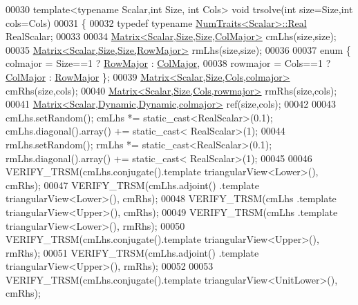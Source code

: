 \begin{DoxyCode}
00030 \textcolor{keyword}{template}<\textcolor{keyword}{typename} Scalar,\textcolor{keywordtype}{int} Size, \textcolor{keywordtype}{int} Cols> \textcolor{keywordtype}{void} trsolve(\textcolor{keywordtype}{int} size=Size,\textcolor{keywordtype}{int} cols=Cols)
00031 \{
00032   \textcolor{keyword}{typedef} \textcolor{keyword}{typename} \hyperlink{group___core___module_struct_eigen_1_1_num_traits}{NumTraits<Scalar>::Real} RealScalar;
00033 
00034   \hyperlink{group___core___module_class_eigen_1_1_matrix}{Matrix<Scalar,Size,Size,ColMajor>} cmLhs(size,size);
00035   \hyperlink{group___core___module_class_eigen_1_1_matrix}{Matrix<Scalar,Size,Size,RowMajor>} rmLhs(size,size);
00036 
00037   \textcolor{keyword}{enum} \{  colmajor = Size==1 ? \hyperlink{group__enums_ggaacded1a18ae58b0f554751f6cdf9eb13acfcde9cd8677c5f7caf6bd603666aae3}{RowMajor} : \hyperlink{group__enums_ggaacded1a18ae58b0f554751f6cdf9eb13a0cbd4bdd0abcfc0224c5fcb5e4f6669a}{ColMajor},
00038           rowmajor = Cols==1 ? \hyperlink{group__enums_ggaacded1a18ae58b0f554751f6cdf9eb13a0cbd4bdd0abcfc0224c5fcb5e4f6669a}{ColMajor} : \hyperlink{group__enums_ggaacded1a18ae58b0f554751f6cdf9eb13acfcde9cd8677c5f7caf6bd603666aae3}{RowMajor} \};
00039   \hyperlink{group___core___module_class_eigen_1_1_matrix}{Matrix<Scalar,Size,Cols,colmajor>} cmRhs(size,cols);
00040   \hyperlink{group___core___module_class_eigen_1_1_matrix}{Matrix<Scalar,Size,Cols,rowmajor>} rmRhs(size,cols);
00041   \hyperlink{group___core___module_class_eigen_1_1_matrix}{Matrix<Scalar,Dynamic,Dynamic,colmajor>} ref(size,cols);
00042 
00043   cmLhs.setRandom(); cmLhs *= \textcolor{keyword}{static\_cast<}RealScalar\textcolor{keyword}{>}(0.1); cmLhs.diagonal().array() += \textcolor{keyword}{static\_cast<}
      RealScalar\textcolor{keyword}{>}(1);
00044   rmLhs.setRandom(); rmLhs *= \textcolor{keyword}{static\_cast<}RealScalar\textcolor{keyword}{>}(0.1); rmLhs.diagonal().array() += \textcolor{keyword}{static\_cast<}
      RealScalar\textcolor{keyword}{>}(1);
00045 
00046   VERIFY\_TRSM(cmLhs.conjugate().template triangularView<Lower>(), cmRhs);
00047   VERIFY\_TRSM(cmLhs.adjoint()  .template triangularView<Lower>(), cmRhs);
00048   VERIFY\_TRSM(cmLhs            .\textcolor{keyword}{template} triangularView<Upper>(), cmRhs);
00049   VERIFY\_TRSM(cmLhs            .\textcolor{keyword}{template} triangularView<Lower>(), rmRhs);
00050   VERIFY\_TRSM(cmLhs.conjugate().template triangularView<Upper>(), rmRhs);
00051   VERIFY\_TRSM(cmLhs.adjoint()  .template triangularView<Upper>(), rmRhs);
00052 
00053   VERIFY\_TRSM(cmLhs.conjugate().template triangularView<UnitLower>(), cmRhs);

\end{DoxyCode}
